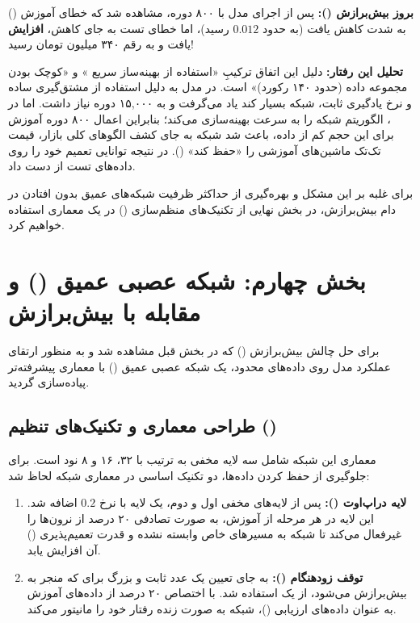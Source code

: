 \documentclass[12pt, a4paper]{article}
\begin{document}
\textbf{بروز بیش‌برازش ():}
پس از اجرای مدل با ۸۰۰ دوره، مشاهده شد که خطای آموزش () به شدت کاهش یافت (به حدود $0.012$ رسید)، اما خطای تست به جای کاهش، \textbf{افزایش} یافت و  به رقم ۳۴۰ میلیون تومان رسید!

\textbf{تحلیل این رفتار:}
دلیل این اتفاق ترکیبِ «استفاده از بهینه‌ساز سریع » و «کوچک بودن مجموعه داده (حدود ۱۴۰ رکورد)» است. در مدل  به دلیل استفاده از مشتق‌گیری ساده و نرخ یادگیری ثابت، شبکه بسیار کند یاد می‌گرفت و به ۱۵,۰۰۰ دوره نیاز داشت. اما در ، الگوریتم  شبکه را به سرعت بهینه‌سازی می‌کند؛ بنابراین اعمال ۸۰۰ دوره آموزش برای این حجم کم از داده، باعث شد شبکه به جای کشف الگوهای کلی بازار، قیمت تک‌تک ماشین‌های آموزشی را «حفظ کند» (). در نتیجه توانایی تعمیم خود را روی داده‌های تست از دست داد.

برای غلبه بر این مشکل و بهره‌گیری از حداکثر ظرفیت شبکه‌های عمیق بدون افتادن در دام بیش‌برازش، در بخش نهایی از تکنیک‌های منظم‌سازی () در یک معماری  استفاده خواهیم کرد.

\section{بخش چهارم: شبکه عصبی عمیق () و مقابله با بیش‌برازش}
برای حل چالش بیش‌برازش () که در بخش قبل مشاهده شد و به منظور ارتقای عملکرد مدل روی داده‌های محدود، یک شبکه عصبی عمیق () با معماری پیشرفته‌تر پیاده‌سازی گردید.

\subsection{طراحی معماری  و تکنیک‌های تنظیم ()}
معماری این شبکه شامل سه لایه مخفی به ترتیب با ۳۲، ۱۶ و ۸ نود است. برای جلوگیری از حفظ کردن داده‌ها، دو تکنیک اساسی در معماری شبکه لحاظ شد:

\begin{enumerate}
	\item \textbf{لایه دراپ‌اوت ():} پس از لایه‌های مخفی اول و دوم، یک لایه  با نرخ $0.2$ اضافه شد. این لایه در هر مرحله از آموزش، به صورت تصادفی ۲۰ درصد از نرون‌ها را غیرفعال می‌کند تا شبکه به مسیرهای خاص وابسته نشده و قدرت تعمیم‌پذیری () آن افزایش یابد.
	\item \textbf{توقف زودهنگام ():} به جای تعیین یک عدد ثابت و بزرگ برای  که منجر به بیش‌برازش می‌شود، از یک  استفاده شد. با اختصاص ۲۰ درصد از داده‌های آموزش به عنوان داده‌های ارزیابی ()، شبکه به صورت زنده رفتار خود را مانیتور می‌کند.
\end{enumerate}
\end{document}
